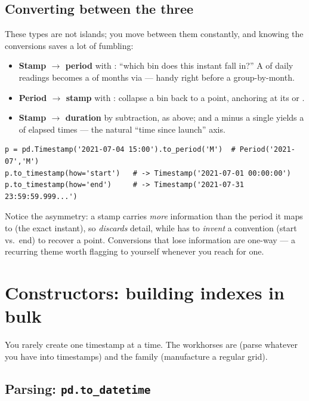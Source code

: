 \documentclass[11pt]{article}
\begin{document}
\subsection{Converting between the three}

These types are not islands; you move between them constantly, and knowing the conversions saves a lot of fumbling:
\begin{itemize}
  \item \textbf{Stamp $\to$ period} with : ``which bin does this instant fall in?'' A  of daily readings becomes a  of months via  --- handy right before a group-by-month.
  \item \textbf{Period $\to$ stamp} with : collapse a bin back to a point, anchoring at its  or .
  \item \textbf{Stamp $\to$ duration} by subtraction, as above; and a  minus a single  yields a  of elapsed times --- the natural ``time since launch'' axis.
\end{itemize}

\begin{lstlisting}
p = pd.Timestamp('2021-07-04 15:00').to_period('M')  # Period('2021-07','M')
p.to_timestamp(how='start')   # -> Timestamp('2021-07-01 00:00:00')
p.to_timestamp(how='end')     # -> Timestamp('2021-07-31 23:59:59.999...')
\end{lstlisting}

Notice the asymmetry: a stamp carries \emph{more} information than the period it maps to (the exact instant), so  \emph{discards} detail, while  has to \emph{invent} a convention (start vs.\ end) to recover a point. Conversions that lose information are one-way --- a recurring theme worth flagging to yourself whenever you reach for one.

\section{Constructors: building indexes in bulk}

You rarely create one timestamp at a time. The workhorses are  (parse whatever you have into timestamps) and the  family (manufacture a regular grid).

\subsection{Parsing: \texttt{pd.to\_datetime}}
\end{document}
